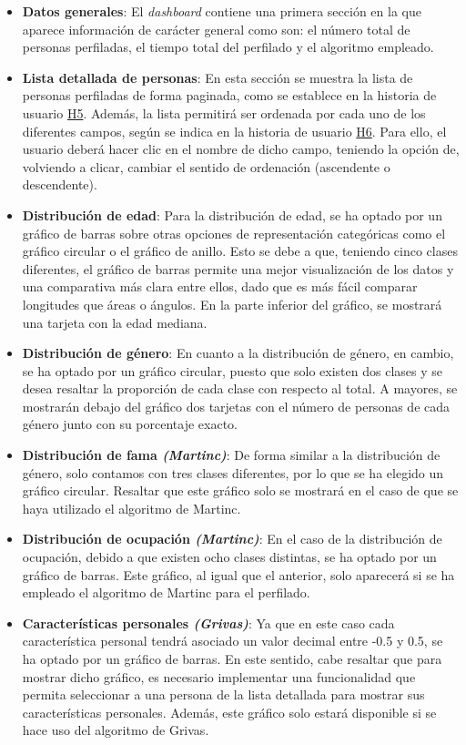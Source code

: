 \begin{itemize}
	\item \textbf{Datos generales}: El \textit{dashboard} contiene una primera sección en la que aparece información de carácter general
	      como son: el número total de personas perfiladas, el tiempo total del perfilado y el algoritmo empleado.
	\item \textbf{Lista detallada de personas}: En esta sección se muestra la lista de personas perfiladas de forma paginada, como se establece en la historia de usuario \hyperref[req:hu5]{H5}. Además, la lista
	      permitirá ser ordenada por cada uno de los diferentes campos, según se indica en la historia de usuario \hyperref[req:hu6]{H6}. Para ello, el usuario deberá hacer clic en el nombre de dicho campo, teniendo
	      la opción de, volviendo a clicar, cambiar el sentido de ordenación (ascendente o descendente).
	\item \textbf{Distribución de edad}: Para la distribución de edad, se ha optado por un gráfico de barras sobre otras opciones de representación
	      categóricas como el gráfico circular o el gráfico de anillo. Esto se debe a que, teniendo cinco clases diferentes, el gráfico de barras permite una mejor visualización
	      de los datos y una comparativa más clara entre ellos, dado que es más fácil comparar longitudes que áreas o ángulos. En la parte inferior del gráfico,
	      se mostrará una tarjeta con la edad mediana.
	\item \textbf{Distribución de género}: En cuanto a la distribución de género, en cambio, se ha optado por un gráfico circular, puesto que solo existen dos clases
	      y se desea resaltar la proporción de cada clase con respecto al total. A mayores, se mostrarán debajo del gráfico dos tarjetas con el número de personas
	      de cada género junto con su porcentaje exacto.
	\item \textbf{Distribución de fama \textit{(Martinc)}}: De forma similar a la distribución de género, solo contamos con tres clases diferentes, por lo que
	      se ha elegido un gráfico circular. Resaltar que este gráfico solo se mostrará en el caso de que se haya utilizado el algoritmo de Martinc.
	\item \textbf{Distribución de ocupación \textit{(Martinc)}}: En el caso de la distribución de ocupación, debido a que existen ocho clases distintas, se ha optado
	      por un gráfico de barras. Este gráfico, al igual que el anterior, solo aparecerá si se ha empleado el algoritmo de Martinc para el perfilado.
	\item \textbf{Características personales \textit{(Grivas)}}: Ya que en este caso cada característica personal tendrá asociado un valor decimal entre -0.5 y 0.5,
	      se ha optado por un gráfico de barras. En este sentido, cabe resaltar que para mostrar dicho gráfico, es necesario implementar una funcionalidad que permita
	      seleccionar a una persona de la lista detallada para mostrar sus características personales. Además, este gráfico solo estará disponible si se hace uso del algoritmo de Grivas.
\end{itemize}

